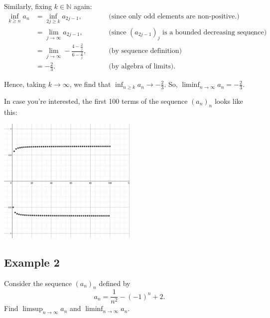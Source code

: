 \documentclass[
  10pt,
  a4paper]{article}
\theoremstyle{plain}
\theoremstyle{definition}
\theoremstyle{plain}
\theoremstyle{plain}
\theoremstyle{plain}
\theoremstyle{plain}
\theoremstyle{definition}
\theoremstyle{definition}
\theoremstyle{remark}
\theoremstyle{remark}
\let\BeginKnitrBlock\begin \let\EndKnitrBlock\end
\begin{document}
Similarly, fixing \(k \in \mathbb{N}\) again:
\begin{align*}
\inf_{k\geq n}a_n &= \inf_{2j \geq k} a_{2j-1}, \; \; &&\text{(since only odd elements are non-positive.)}\\
&= \lim_{j \to \infty} a_{2j-1}, \; \; &&\text{(since $(a_{2j-1})_j$ is a bounded decreasing sequence)},\\
&= \lim_{j \to \infty}-\frac{4-\frac{2}{j}}{6 - \frac{2}{j}}, \; \; \quad &&\text{(by sequence definition)}\\
&= -\frac{2}{3}. \; \; \quad &&\text{(by algebra of limits)}.
\end{align*}

Hence, taking \(k \to \infty\), we find that \(\inf_{n \geq k} a_n \to -\frac{2}{3}\). So, \(\liminf_{n \to \infty} a_n = -\frac{2}{3}\).

In case you're interested, the first 100 terms of the sequence \((a_n)_n\) looks like this:

\includegraphics[width=0.5\textwidth,height=\textheight]{Image.png}

\hypertarget{example-2}{%
\subsection*{Example 2}\label{example-2}}

\BeginKnitrBlock{example}
{\label{exm:ex2} }Consider the sequence \((a_n)_{n}\) defined by \[a_n = \frac{1}{n^2} - (-1)^n + 2.\] Find \(\limsup_{n \to \infty} a_n\) and \(\liminf_{n \to \infty} a_n\).
\EndKnitrBlock{example}
\end{document}
